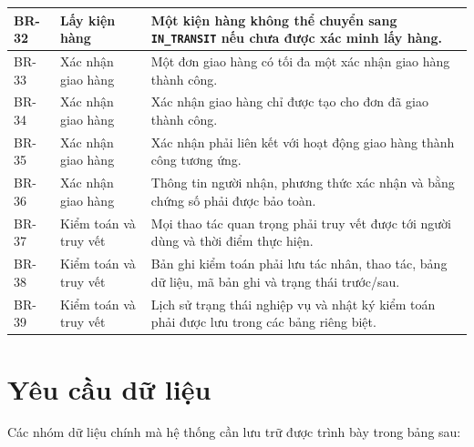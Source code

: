 \begin{longtable}{|p{1.8cm}|p{3.8cm}|p{9cm}|}
BR-32 & Lấy kiện hàng & Một kiện hàng không thể chuyển sang \texttt{IN\_TRANSIT} nếu chưa được xác minh lấy hàng. \\ \hline 
BR-33 & Xác nhận giao hàng & Một đơn giao hàng có tối đa một xác nhận giao hàng thành công. \\ \hline 
BR-34 & Xác nhận giao hàng & Xác nhận giao hàng chỉ được tạo cho đơn đã giao thành công. \\ \hline 
BR-35 & Xác nhận giao hàng & Xác nhận phải liên kết với hoạt động giao hàng thành công tương ứng. \\ \hline 
BR-36 & Xác nhận giao hàng & Thông tin người nhận, phương thức xác nhận và bằng chứng số phải được bảo toàn. \\ \hline 
BR-37 & Kiểm toán và truy vết & Mọi thao tác quan trọng phải truy vết được tới người dùng và thời điểm thực hiện. \\ \hline 
BR-38 & Kiểm toán và truy vết & Bản ghi kiểm toán phải lưu tác nhân, thao tác, bảng dữ liệu, mã bản ghi và trạng thái trước/sau. \\ \hline 
BR-39 & Kiểm toán và truy vết & Lịch sử trạng thái nghiệp vụ và nhật ký kiểm toán phải được lưu trong các bảng riêng biệt. \\ \hline 
\end{longtable}
\normalsize


\section{Yêu cầu dữ liệu}

Các nhóm dữ liệu chính mà hệ thống cần lưu trữ được trình bày trong bảng sau:

